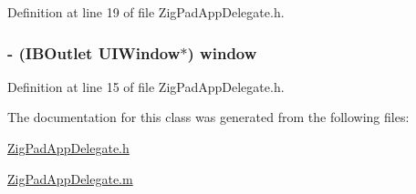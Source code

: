 Definition at line 19 of file ZigPadAppDelegate.h.

\hypertarget{interface_zig_pad_app_delegate_a055d472434a4ee0b915c207957a400e1}{
\subsubsection[{window}]{\setlength{\rightskip}{0pt plus 5cm}-\/ (IBOutlet UIWindow$\ast$) window}}
\label{interface_zig_pad_app_delegate_a055d472434a4ee0b915c207957a400e1}


Definition at line 15 of file ZigPadAppDelegate.h.



The documentation for this class was generated from the following files:\begin{DoxyCompactItemize}
\item 
\hyperlink{_zig_pad_app_delegate_8h}{ZigPadAppDelegate.h}\item 
\hyperlink{_zig_pad_app_delegate_8m}{ZigPadAppDelegate.m}\end{DoxyCompactItemize}
